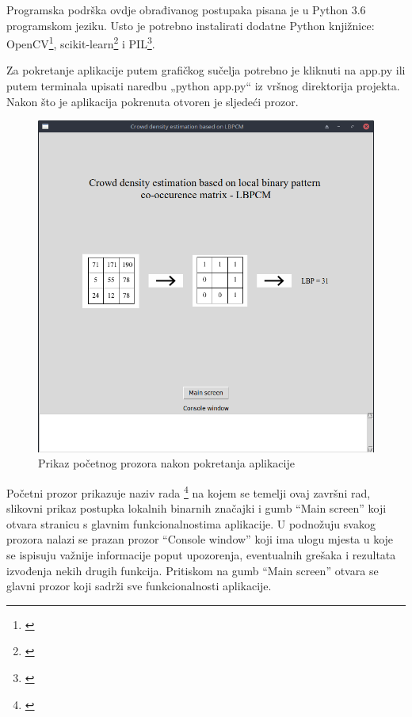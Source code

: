 \documentclass[times, utf8, zavrsni]{fer}
\begin{document}
Programska podrška ovdje obrađivanog postupaka pisana je u Python 3.6 
programskom jeziku. Usto je potrebno instalirati dodatne Python 
knjižnice: OpenCV\footnote{\cite{opencv.org}}, scikit-learn\footnote{\cite{scikit}} i PIL\footnote{\cite{pil}}.

Za pokretanje aplikacije putem grafičkog sučelja potrebno je kliknuti 
na app.py ili putem terminala upisati naredbu „python app.py“ iz 
vršnog direktorija projekta. Nakon što je aplikacija pokrenuta 
otvoren je sljedeći prozor. 

\begin{figure}[ht]
\centering
\includegraphics[scale=0.35]{img/startpage.png}
\caption{Prikaz početnog prozora nakon pokretanja aplikacije}
\end{figure}

\newpage

Početni prozor prikazuje naziv rada \footnote{\cite{6266412}} na kojem se temelji ovaj završni rad, 
slikovni prikaz postupka lokalnih binarnih značajki i gumb \enquote{Main screen}
koji otvara stranicu s glavnim funkcionalnostima aplikacije. U podnožuju svakog
prozora nalazi se prazan prozor \enquote{Console window} koji ima ulogu
mjesta u koje se ispisuju važnije informacije poput upozorenja, eventualnih 
grešaka i rezultata izvođenja nekih drugih funkcija. Pritiskom na gumb \enquote{Main screen}
otvara se glavni prozor koji sadrži sve funkcionalnosti aplikacije.
\end{document}
